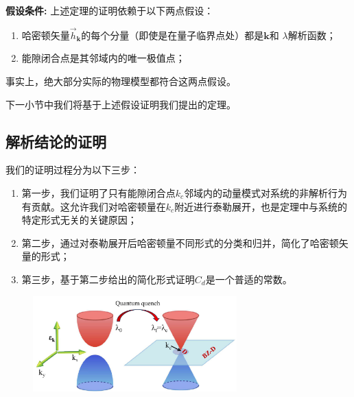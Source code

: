 			{\bf 假设条件:}
			上述定理的证明依赖于以下两点假设：
			\begin{enumerate}
				\item 哈密顿矢量${\vec{h}}_{\mathbf{k}}$的每个分量（即使是在量子临界点处）都是$\mathbf{k}$和 $\lambda$解析函数；
				\item 能隙闭合点是其邻域内的唯一极值点；
			\end{enumerate}
			事实上，绝大部分实际的物理模型都符合这两点假设。
			
			下一小节中我们将基于上述假设证明我们提出的定理。
			
		\subsection{解析结论的证明}
		
			我们的证明过程分为以下三步：
			\begin{enumerate}
				\item 第一步，我们证明了只有能隙闭合点$k_c$邻域内的动量模式对系统的非解析行为有贡献。这允许我们对哈密顿量在$k_c$附近进行泰勒展开，也是定理中与系统的特定形式无关的关键原因；
				\item 第二步，通过对泰勒展开后哈密顿量不同形式的分类和归并，简化了哈密顿矢量的形式；
				\item 第三步，基于第二步给出的简化形式证明$C_d$是一个普适的常数。
			\end{enumerate}
		
			\begin{figure}[!htp]
				\centering
				\includegraphics[width=0.7\textwidth]{figures/QV_BZ_D.pdf}
				 \label{Fig:BZ_D}
			\end{figure} 		
		
